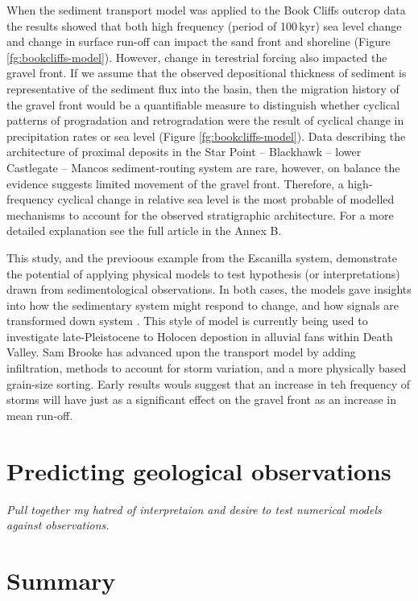 When the sediment transport model was applied to the Book Cliffs outcrop data the results showed that both high frequency (period of 100\,kyr) sea level change and change in surface run-off can impact the sand front and shoreline (Figure \ref{fg:bookcliffs-model}). However, change in terestrial forcing also impacted the gravel front. If we assume that the observed depositional thickness of sediment is representative of the sediment flux into the basin, then the migration history of the gravel front would be a quantifiable measure to distinguish whether cyclical patterns of progradation and retrogradation were the result of cyclical change in precipitation rates or sea level (Figure \ref{fg:bookcliffs-model}). Data describing the architecture of proximal deposits in the Star Point -- Blackhawk -- lower Castlegate -- Mancos sediment-routing system are rare, however, on balance the evidence suggests limited movement of the gravel front. Therefore, a high-frequency cyclical change in relative sea level is the most probable of modelled mechanisms to account for the observed stratigraphic architecture. For a more detailed explanation see the full article in the Annex B.

This study, and the previoous example from the Escanilla system, demonstrate the potential of applying physical models to test hypothesis (or interpretations) drawn from sedimentological observations. In both cases, the models gave insights into how the sedimentary system might respond to change, and how signals are transformed down system \citep{armitage-etal-ngeo-2011}. This style of model is currently being used to investigate late-Pleistocene to Holocen depostion in alluvial fans within Death Valley. Sam Brooke has advanced upon the transport model by adding infiltration, methods to account for storm variation, and a more physically based grain-size sorting. Early results wouls suggest that an increase in teh frequency of storms will have just as a significant effect on the gravel front as an increase in mean run-off. 

\section{Predicting geological observations}



\emph{Pull together my hatred of interpretaion and desire to test numerical models against observations.}

\section{Summary}
